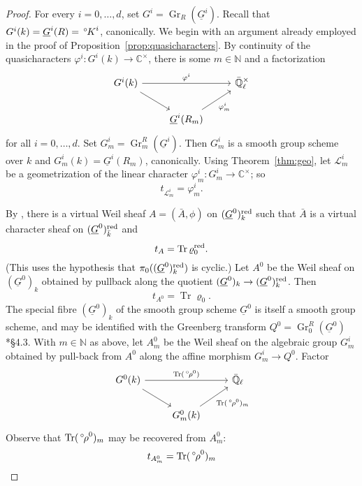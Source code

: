 \documentclass[10pt]{amsart}
\theoremstyle{plain}
\theoremstyle{definition}
\newcommand{\NN}{{\mathbb{N}}}
\newcommand{\CC}{{\mathbb{C}}}
\newcommand{\EE}{\mathbb{\bar Q}_\ell}
\newcommand{\bFq}{\bar{k}}
\newcommand{\Fq}{k}
\newcommand{\EEx}{\EE^\times}
\DeclareMathOperator{\Gr}{Gr}
\DeclareMathOperator{\trace}{Tr}
\newcommand{\trFrob}[1]{t_{#1}}
\newcommand{\cs}[1]{{\mathcal{#1}}}
\newcommand{\oK}{{\,^\circ \hskip-1pt K}}
\newcommand{\orho}{{\,^\circ \hskip-1pt \rho}}
\begin{document}
\begin{proof}
For every $i=0, \ldots ,d$, set $G^i = \Gr_{R}(\underline{G}^i)$.
Recall that $G^i(\Fq) = \underline{G}^i(R) = \oK^i$, canonically.
We begin with an argument already employed in the proof of Proposition~\ref{prop:quasicharacters}.
By continuity of the quasicharacters $\varphi^i : G^i(\Fq) \to \CC^\times$, there is some $m \in \NN$ and a factorization
\[
\begin{tikzcd}
G^i(\Fq) \arrow{rr}{\varphi^i} \arrow{rd} && \EEx\\
& \underline{G}^i(R_m) \arrow{ru}[swap]{\varphi^i_m} 
\end{tikzcd}
\] 
for all $i=0, \ldots, d$.
Set $G_m^i = \Gr_m^{R}(\underline{G}^i)$.
Then $G_m^i$ is a smooth group scheme over $\Fq$ and $G_m^i(\Fq) = \underline{G}^i(R_m)$, canonically.
Using Theorem~\ref{thm:geo}, let $\cs{L}^i_m$ be a geometrization of the linear character $\varphi^i_m: G_m^i \to \CC^\times$; so
\[
\trFrob{\cs{L}^i_m} = \varphi^i_m.
\]

By \cite{lusztig:disconnected1}, there is a virtual Weil sheaf $A = ({\bar A},\phi)$ on $(\underline{G}^0)_\Fq^\reductive$ such that ${\bar A}$ is a virtual character sheaf on $(\underline{G}^0)_{\bFq}^\reductive$ and
\[
\trFrob{A} = \trace \varrho_0^\reductive.
\]
(This uses the hypothesis that $\pi_0((\underline{G}^0)_\Fq^\reductive)$ is cyclic.)
Let $A^0$ be the Weil sheaf on $(\underline{G}^0)_\Fq$ obtained by pullback along the quotient $(\underline{G}^0)_\Fq \to (\underline{G}^0)_\Fq^\reductive$.
Then 
\[
\trFrob{A^0} = \trace \varrho_0.
\]
The special fibre $(\underline{G}^0)_\Fq$ of the smooth group scheme $\underline{G}^0$ is itself a smooth group scheme, and may be identified with the Greenberg transform $Q^0 = \Gr^{R}_0(\underline{G}^0)$ \cite{cunningham-roe:13a}*{\S 4.3}. 
With $m\in \NN$ as above, let ${A}_m^0$ be the Weil sheaf on the algebraic group $G_m^i$ obtained by pull-back from $A^0$ along the affine morphism $G_m^i \to Q^0$.
Factor
\[
\begin{tikzcd}
G^0(\Fq) \arrow{rr}{\trace(\orho^0)} \arrow{rd} && \EE \\
& G_m^0(\Fq) \arrow{ru}[swap]{\trace(\orho^0)_m} 
\end{tikzcd}
\]
Observe that $\trace(\orho^0)_m$ may be recovered from ${A}_m^0$:
\[
\trFrob{{A}^0_m} = \trace(\orho^0)_m
\]


\end{proof}
\end{document}
